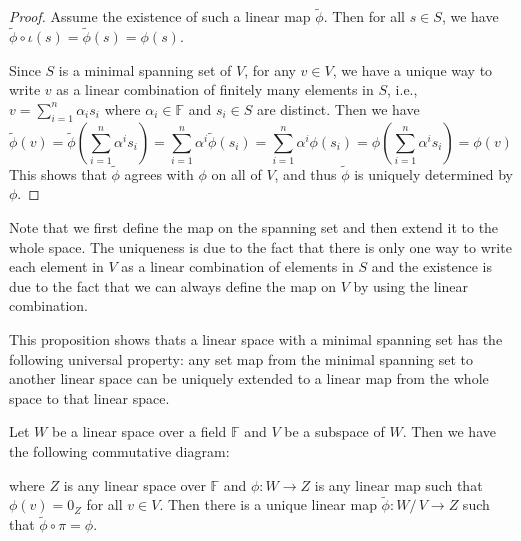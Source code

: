 \documentclass[
	11pt, %
	fleqn, %
	a4paper, %
]{LegrandOrangeBook}
\newcommand{\Hom}{\mathsf{Hom}} %
\newcommand{\quotient}[2]{#1/\, #2} %
\newcommand{\F}{\mathbb{F}} %
\newcommand{\Map}{\mathsf{Map}} %
\begin{document}
\begin{proof}
    Assume the existence of such a linear map $\tilde{\phi}$. Then for all $s \in S$, we have $\tilde{\phi} \circ \iota (s) = \tilde{\phi}(s) = \phi(s)$.

    Since $S$ is a minimal spanning set of $V$, for any $v \in V$, we have a unique way to write $v$ as a linear combination of finitely many elements in $S$, i.e., $v = \sum_{i=1}^{n} \alpha_i s_i$ where $\alpha_i \in \F$ and $s_i \in S$ are distinct. Then we have 
    \[
        \tilde{\phi}(v) = \tilde{\phi}\left(\sum_{i=1}^{n} \alpha^i s_i\right) = \sum_{i=1}^{n} \alpha^i \tilde{\phi}(s_i) = \sum_{i=1}^{n} \alpha^i \phi(s_i) = \phi\left(\sum_{i=1}^{n} \alpha^i s_i\right) = \phi(v)
    \]
    This shows that $\tilde{\phi}$ agrees with $\phi$ on all of $V$, and thus $\tilde{\phi}$ is uniquely determined by $\phi$.
\end{proof}

Note that we first define the map on the spanning set and then extend it to the whole space. The uniqueness is due to the fact that there is only one way to write each element in $V$ as a linear combination of elements in $S$ and the existence is due to the fact that we can always define the map on $V$ by using the linear combination.

This proposition shows thats a linear space with a minimal spanning set has the following universal property: any set map from the minimal spanning set to another linear space can be uniquely extended to a linear map from the whole space to that linear space.

\begin{center}
\end{center}

\begin{proposition}
    Let $W$ be a linear space over a field $\F$ and $V$ be a subspace of $W$. Then we have the following commutative diagram:
    \begin{center}
    \end{center}
    where $Z$ is any linear space over $\F$ and $\phi : W \to Z$ is any linear map such that $\phi(v) = 0_Z$ for all $v \in V$. Then there is a unique linear map $\tilde{\phi} : \quotient{W}{V} \to Z$ such that $\tilde{\phi} \circ \pi = \phi$.
\end{proposition}
\end{document}
